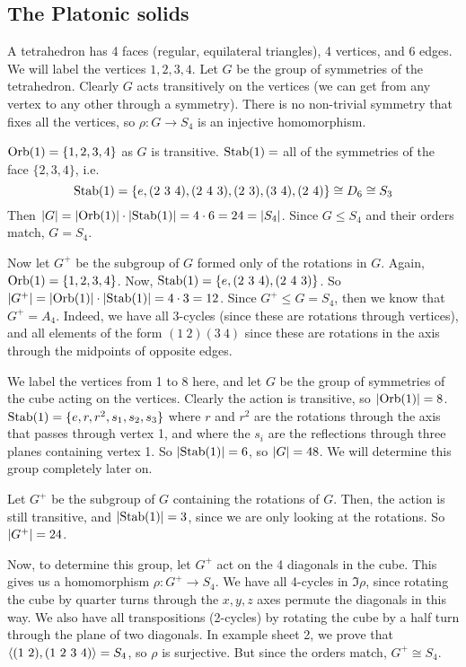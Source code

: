 \subsection{The Platonic solids}
\begin{example}[tetrahedron]
	A tetrahedron has 4 faces (regular, equilateral triangles), 4 vertices, and 6 edges.
	We will label the vertices \(1, 2, 3, 4\).
	Let \(G\) be the group of symmetries of the tetrahedron.
	Clearly \(G\) acts transitively on the vertices (we can get from any vertex to any other through a symmetry).
	There is no non-trivial symmetry that fixes all the vertices, so \(\rho\colon G \to S_4\) is an injective homomorphism.

	\(\operatorname{Orb}(1) = \{ 1, 2, 3, 4 \}\) as \(G\) is transitive.
	\(\operatorname{Stab}(1) =\) all of the symmetries of the face \(\{2,3,4\}\), i.e.
	\[
		\operatorname{Stab}(1) = \{ e, (2\ 3\ 4), (2\ 4\ 3), (2\ 3), (3\ 4), (2\ 4) \} \cong D_6 \cong S_3
	\]
	Then \(\abs{G} = \abs{\operatorname{Orb}(1)} \cdot \abs{\operatorname{Stab}(1)} = 4 \cdot 6 = 24 = \abs{S_4}\).
	Since \(G \leq S_4\) and their orders match, \(G = S_4\).

	Now let \(G^+\) be the subgroup of \(G\) formed only of the rotations in \(G\).
	Again, \(\operatorname{Orb}(1) = \{ 1, 2, 3, 4 \}\).
	Now, \(\operatorname{Stab}(1) = \{ e, (2\ 3\ 4), (2\ 4\ 3) \}\).
	So \(\abs{G^+} = \abs{\operatorname{Orb}(1)} \cdot \abs{\operatorname{Stab}(1)} = 4 \cdot 3 = 12\).
	Since \(G^+ \leq G = S_4\), then we know that \(G^+ = A_4\).
	Indeed, we have all 3-cycles (since these are rotations through vertices), and all elements of the form \((1\ 2)(3\ 4)\) since these are rotations in the axis through the midpoints of opposite edges.
\end{example}

\begin{example}[cube]
	We label the vertices from 1 to 8 here, and let \(G\) be the group of symmetries of the cube acting on the vertices.
	Clearly the action is transitive, so \(\abs{\operatorname{Orb}(1)} = 8\).
	\(\operatorname{Stab}(1) = \{ e, r, r^2, s_1, s_2, s_3 \}\) where \(r\) and \(r^2\) are the rotations through the axis that passes through vertex 1, and where the \(s_i\) are the reflections through three planes containing vertex 1.
	So \(\abs{\operatorname{Stab}(1)} = 6\), so \(\abs{G} = 48\).
	We will determine this group completely later on.

	Let \(G^+\) be the subgroup of \(G\) containing the rotations of \(G\).
	Then, the action is still transitive, and \(\abs{\operatorname{Stab}(1)} = 3\), since we are only looking at the rotations.
	So \(\abs{G^+} = 24\).

	Now, to determine this group, let \(G^+\) act on the 4 diagonals in the cube.
	This gives us a homomorphism \(\rho\colon G^+ \to S_4\).
	We have all 4-cycles in \(\Im \rho\), since rotating the cube by quarter turns through the \(x, y, z\) axes permute the diagonals in this way.
	We also have all transpositions (2-cycles) by rotating the cube by a half turn through the plane of two diagonals.
	In example sheet 2, we prove that \(\left\langle{} (1\ 2), (1\ 2\ 3\ 4) \right\rangle = S_4\), so \(\rho\) is surjective.
	But since the orders match, \(G^+ \cong S_4\).
\end{example}

